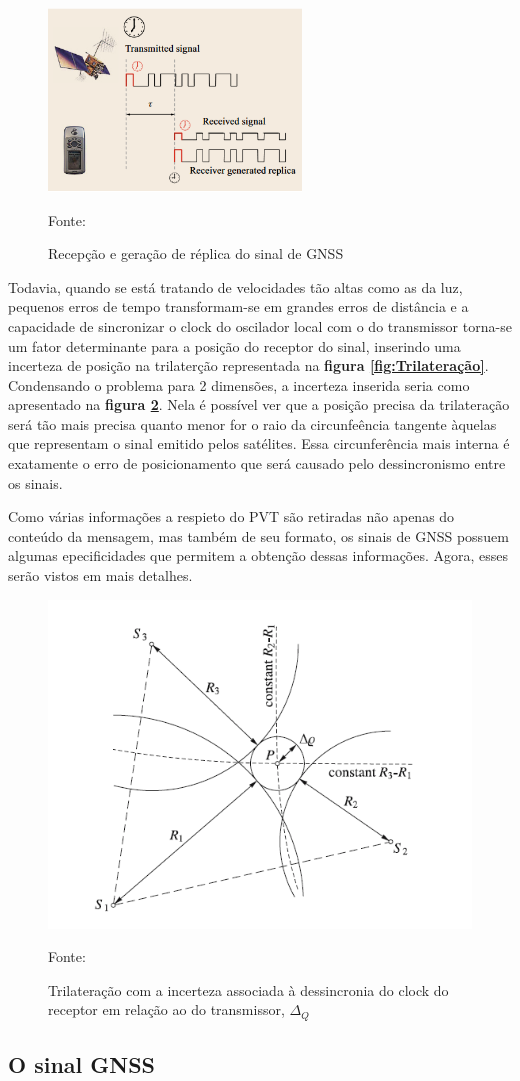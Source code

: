 \begin{figure}[ht]
    \centering
    \caption{Recepção e geração de réplica do sinal de GNSS}
    \includegraphics[width = 0.6\textwidth]{figuras/Recepção do sinal de GNSS.png}

    Fonte: \cite{Teunissen2017}
    \label{fig:Recepção_GNSS}
\end{figure}


Todavia, quando se está tratando de velocidades tão altas como as da luz, pequenos erros de tempo transformam-se em grandes erros de distância e a capacidade de sincronizar o clock do oscilador local com o do transmissor torna-se um fator determinante para a posição do receptor do sinal, inserindo uma incerteza de posição na trilaterção representada na \textbf{figura \ref{fig:Trilateração}}. Condensando o problema para 2 dimensões, a incerteza inserida seria como apresentado na \textbf{figura \ref{fig:Trilateração real}}. Nela é possível ver que a posição precisa da trilateração será tão mais precisa quanto menor for o raio da circunfeência tangente àquelas que representam o sinal emitido pelos satélites. Essa circunferência mais interna é exatamente o erro de posicionamento que será causado pelo dessincronismo entre os sinais.

Como várias informações a respieto do PVT são retiradas não apenas do conteúdo da mensagem, mas também de seu formato, os sinais de GNSS possuem algumas epecificidades que permitem a obtenção dessas informações. Agora, esses serão vistos em mais detalhes. 

\begin{figure}[h]
    \centering
    \caption{Trilateração com a incerteza associada à dessincronia do clock do receptor em relação ao do transmissor, $\Delta_Q$}
    \includegraphics[width = 0.6 \textwidth]{figuras/Trilateração real.png}
    
    Fonte: \cite{Wellenhoff2008}
    \label{fig:Trilateração real}
\end{figure}

\subsection{O sinal GNSS}